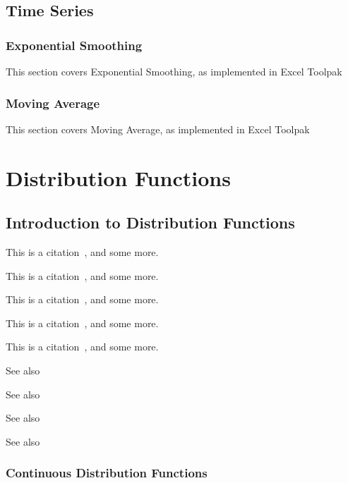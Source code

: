 \newpage
\section{Time Series}

\subsection{Exponential Smoothing}
\label{Exponential Smoothing}
This section covers Exponential Smoothing, as implemented in Excel Toolpak


\subsection{Moving Average}
\label{Moving Average}
This section covers Moving Average, as implemented in Excel Toolpak





\chapter{Distribution Functions}

\section{Introduction to Distribution Functions}
\label{DistributionFunctionsIntroduction} 


This is a citation~\citet{walck_2007}, and some more.

This is a citation~\citet{VanHauwermeiren_2009}, and some more.

This is a citation~\citet{Rinne_book_2008}, and some more.

This is a citation~\citet{Johnson_1994}, and some more.

This is a citation~\citet{Johnson_1995}, and some more.
%
%
%


See also \cite{Monahan_2011}

See also \cite{Lange_2010}

See also \cite{Chernick_2008}

See also \cite{Cheney_2008}


\subsection{Continuous Distribution Functions}

